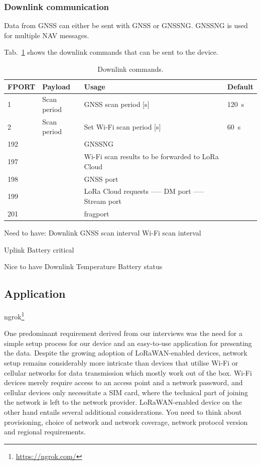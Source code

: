 \subsubsection{Downlink communication}
Data from \ac{GNSS} can either be sent with \ac{GNSS} or \ac{GNSSNG}. \ac{GNSSNG} is used for multiple NAV messages.

Tab.~\ref{tab:downlink_commands} shows the downlink commands that can be sent to the device.

\begin{table}[H]
\centering
\caption{Downlink commands.}
\label{tab:downlink_commands}
\begin{tabular}{l|l|p{9cm}|l}
\ac{FPORT} & Payload & Usage & Default \\ \hline
1 & Scan period & \ac{GNSS} scan period [s] & \SI{120}{\second} \\
2 & Scan period & Set Wi-Fi scan period [s] & \SI{60}{\second} \\
192 & & \ac{GNSSNG}  & \\
197 & & Wi-Fi scan results to be forwarded to LoRa Cloud & \\
198 & & \ac{GNSS} port  & \\
199 & & LoRa Cloud requests ----- DM port ----- Stream port  & \\
201 & & fragport  & \\
\end{tabular}
\end{table}

Need to have:
Downlink
\ac{GNSS} scan interval
Wi-Fi scan interval

Uplink
Battery critical

Nice to have
Downlink
Temperature
Battery status

\subsection{Application}

ngrok\footnote{\url{https://ngrok.com/}}

One predominant requirement derived from our interviews was the need for a simple setup process for our device and an easy-to-use application for presenting the data.
Despite the growing adoption of \ac{LoRaWAN}-enabled devices, network setup remains considerably more intricate than devices that utilise Wi-Fi or cellular networks for data transmission which mostly work out of the box. Wi-Fi devices merely require access to an access point and a network password, and cellular devices only necessitate a SIM card, where the technical part of joining the network is left to the network provider. \ac{LoRaWAN}-enabled device on the other hand entails several additional considerations. You need to think about provisioning, choice of network and network coverage, network protocol version and regional requirements.

